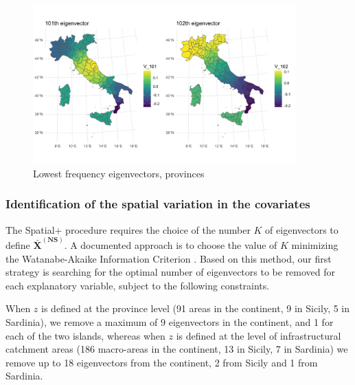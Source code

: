 \documentclass[openany]{book}
\begin{document}
\begin{figure}
  \centering
  \includegraphics[width=0.9\textwidth]{Invalsi/eigen_prov.pdf} 
  \caption{Lowest frequency eigenvectors, provinces}
  \label{fig:eigen_prov}
\end{figure}


\subsubsection{Identification of the spatial variation in the covariates}\label{par:k}
The Spatial+ procedure requires the choice of the number $K$ of eigenvectors to define $\mathbf{\bar{X}^{(NS)}}$. A documented approach \citep{Urdangarin24, Lamouroux} is to choose the value of $K$ minimizing the Watanabe-Akaike Information Criterion \citep[WAIC,][]{WAIC}. Based on this method, our first strategy is searching for the optimal number of eigenvectors to be removed for each explanatory variable, subject to the following constraints.

When $z$ is defined at the province level (91 areas in the continent, 9 in Sicily, 5 in Sardinia), we remove a maximum of 9 eigenvectors in the continent, and 1 for each of the two islands, whereas when $z$ is defined at the level of infrastructural catchment areas (186 macro-areas in the continent, 13 in Sicily, 7 in Sardinia) we remove up to 18 eigenvectors from the continent, 2 from Sicily and 1 from Sardinia.
\end{document}
